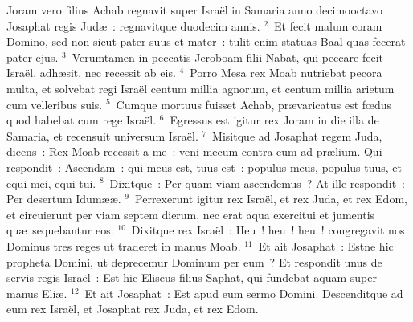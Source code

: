 \bchapter
\lettrine[lines=3,image=true,loversize=0.05,lraise=-0.03]{J}{}oram vero filius Achab regnavit super Isra\"el in Samaria anno decimooctavo Josaphat regis Jud\ae~: regnavitque duodecim annis.
${}^{2}$~Et fecit malum coram Domino, sed non sicut pater suus et mater~: tulit enim statuas Baal quas fecerat pater ejus.
${}^{3}$~Verumtamen in peccatis Jeroboam filii Nabat, qui peccare fecit Isra\"el, adh\ae sit, nec recessit ab eis.
${}^{4}$~Porro Mesa rex Moab nutriebat pecora multa, et solvebat regi Isra\"el centum millia agnorum, et centum millia arietum cum velleribus suis.
${}^{5}$~Cumque mortuus fuisset Achab, pr\ae varicatus est fœdus quod habebat cum rege Isra\"el.
${}^{6}$~Egressus est igitur rex Joram in die illa de Samaria, et recensuit universum Isra\"el.
${}^{7}$~Misitque ad Josaphat regem Juda, dicens~: Rex Moab recessit a me~: veni mecum contra eum ad pr\ae lium. Qui respondit~: Ascendam~: qui meus est, tuus est~: populus meus, populus tuus, et equi mei, equi tui.
${}^{8}$~Dixitque~: Per quam viam ascendemus~? At ille respondit~: Per desertum Idum\ae \ae .
${}^{9}$~Perrexerunt igitur rex Isra\"el, et rex Juda, et rex Edom, et circuierunt per viam septem dierum, nec erat aqua exercitui et jumentis qu\ae\ sequebantur eos.
${}^{10}$~Dixitque rex Isra\"el~: Heu~! heu~! heu~! congregavit nos Dominus tres reges ut traderet in manus Moab.
${}^{11}$~Et ait Josaphat~: Estne hic propheta Domini, ut deprecemur Dominum per eum~? Et respondit unus de servis regis Isra\"el~: Est hic Eliseus filius Saphat, qui fundebat aquam super manus Eli\ae .
${}^{12}$~Et ait Josaphat~: Est apud eum sermo Domini. Descenditque ad eum rex Isra\"el, et Josaphat rex Juda, et rex Edom.


